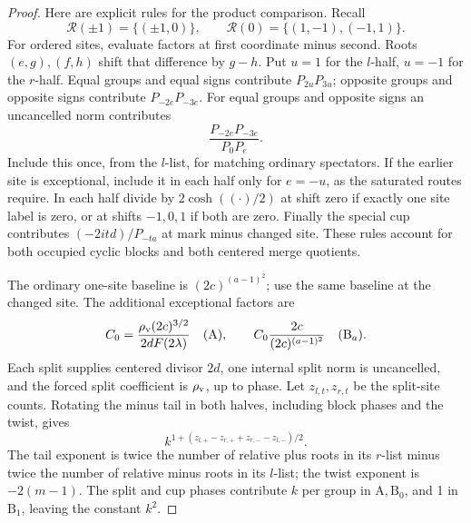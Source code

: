 \begin{proof}
Here are explicit rules for the product comparison.  Recall
\[
 \mathcal R(\pm1)=\{(\pm1,0)\},\qquad
 \mathcal R(0)=\{(1,-1),(-1,1)\}.
\]
For ordered sites, evaluate factors at first coordinate minus second.
Roots \((e,g),(f,h)\) shift that difference by \(g-h\).  Put \(u=1\)
for the \(l\)-half, \(u=-1\) for the \(r\)-half.  Equal groups and
equal signs contribute \(P_{2u}P_{3u}\); opposite groups and opposite
signs contribute \(P_{-2e}P_{-3e}\).  For equal groups and opposite
signs an uncancelled norm contributes
\[
                       \frac{P_{-2e}P_{-3e}}{P_0P_e}.
\]
Include this once, from the \(l\)-list, for matching ordinary
spectators.  If the earlier site is exceptional, include it in each
half only for \(e=-u\), as the saturated routes require.  In each
half divide by \(2\cosh((\cdot)/2)\) at shift zero if exactly one
site label is zero, or at shifts \(-1,0,1\) if both are zero.  Finally
the special cup contributes \((-2itd)/P_{-ta}\) at mark minus changed
site.  These rules account for both occupied cyclic blocks and both
centered merge quotients.

The ordinary one-site baseline is \((2c)^{(a-1)^2}\); use the same
baseline at the changed site.  The additional exceptional factors are
\[
 C_0=\frac{\rho_{\rm v}(2c)^{3/2}}{2dF(2\lambda)}\quad(\mathrm A),
 \qquad C_0\frac{2c}{(2c)^{(a-1)^2}}\quad(\mathrm B_a).
\]
Each split supplies centered divisor \(2d\), one internal split norm
is uncancelled, and the forced split coefficient is \(\rho_{\rm v}\), up to
phase.  Let \(z_{l,t},z_{r,t}\) be the split-site counts.  Rotating the
minus tail in both halves, including block phases and the twist, gives
\[
                    k^{1+(z_{l,+}-z_{r,+}+z_{r,-}-z_{l,-})/2}.
\]
The tail exponent is twice the number of relative plus roots in its
\(r\)-list minus twice the number of relative minus roots in its
\(l\)-list; the twist exponent is \(-2(m-1)\).  The split and cup
phases contribute \(k\) per group in \(\mathrm A,\mathrm B_0\),
and 1 in \(\mathrm B_1\), leaving the constant \(k^2\).


\end{proof}
